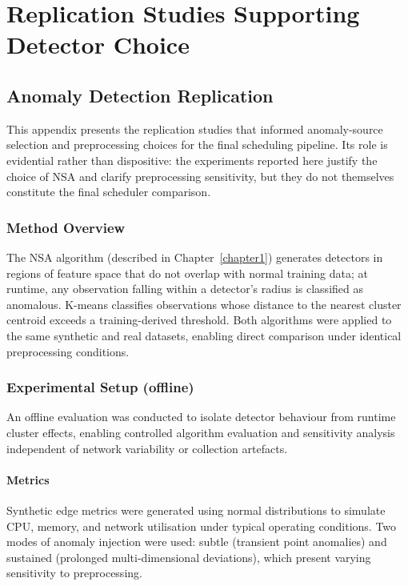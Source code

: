 \chapter{Replication Studies Supporting Detector Choice}
\label{chapter2}

\section{Anomaly Detection Replication}

This appendix presents the replication studies that informed anomaly-source selection and preprocessing choices for the final scheduling pipeline. Its role is evidential rather than dispositive: the experiments reported here justify the choice of NSA and clarify preprocessing sensitivity, but they do not themselves constitute the final scheduler comparison.

\subsection{Method Overview}

The NSA algorithm (described in Chapter~\ref{chapter1}) generates detectors in regions of feature space that do not overlap with normal training data; at runtime, any observation falling within a detector's radius is classified as anomalous. K-means classifies observations whose distance to the nearest cluster centroid exceeds a training-derived threshold. Both algorithms were applied to the same synthetic and real datasets, enabling direct comparison under identical preprocessing conditions.

\subsection{Experimental Setup (offline)}

An offline evaluation was conducted to isolate detector behaviour from runtime cluster effects, enabling controlled algorithm evaluation and sensitivity analysis independent of network variability or collection artefacts.

\subsubsection{Metrics}

Synthetic edge metrics were generated using normal distributions to simulate CPU, memory, and network utilisation under typical operating conditions. Two modes of anomaly injection were used: subtle (transient point anomalies) and sustained (prolonged multi-dimensional deviations), which present varying sensitivity to preprocessing.

